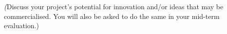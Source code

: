 %
%
\textit(Discuss your project's potential for innovation and/or ideas that may be commercialised. You will also be asked to do the same in your mid-term evaluation.)